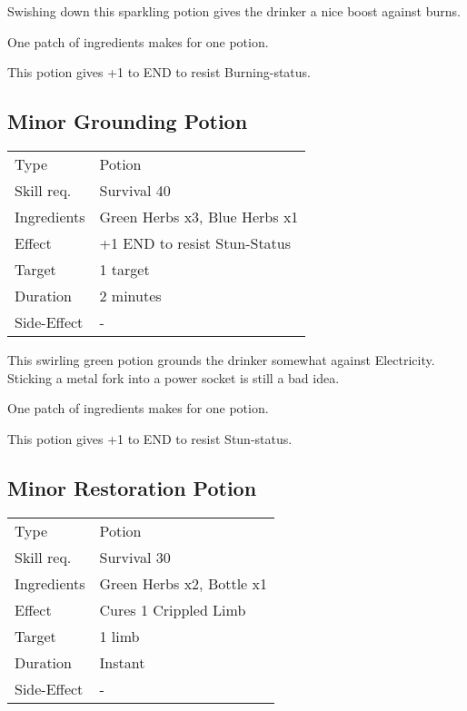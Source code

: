 \documentclass[11pt,a4paper,twocolumn]{book}
\begin{document}
\medskip

Swishing down this sparkling potion gives the drinker a nice boost against burns.

One patch of ingredients makes for one potion.

This potion gives +1 to END to resist Burning-status.


\subsection*{Minor Grounding Potion}
{
	\begin{tabu} to 75mm{| X[l,4] | X[l,8] |}
		\hline
		Type 			& Potion 													\\
		Skill req.	    & Survival 40 												\\
		Ingredients     & Green Herbs x3, Blue Herbs x1								\\
		Effect     		& +1 END to resist Stun-Status 								\\
		Target      	& 1 target													\\
		Duration  		& 2 minutes	 												\\
		Side-Effect     & -															\\ \hline
	\end{tabu}
	
}

\medskip

This swirling green potion grounds the drinker somewhat against Electricity. Sticking a metal fork into a power socket is still a bad idea.

One patch of ingredients makes for one potion.

This potion gives +1 to END to resist Stun-status.


\subsection*{Minor Restoration Potion}
{
	\begin{tabu} to 75mm{| X[l,4] | X[l,8] |}
		\hline
		Type 			& Potion 													\\
		Skill req.	    & Survival 30 												\\
		Ingredients     & Green Herbs x2, Bottle x1									\\
		Effect     		& Cures 1 Crippled Limb 									\\
		Target      	& 1 limb													\\
		Duration  		& Instant	 												\\
		Side-Effect     & -															\\ \hline
	\end{tabu}
	
}
\end{document}
